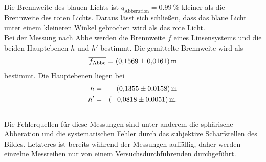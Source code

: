 Die Brennweite des blauen Lichts ist $q_{\text{Abberation}}= \SI{0.99}{\%}$ kleiner als die Brennweite des roten Lichts.
Daraus lässt sich schließen, dass das blaue Licht unter einem kleineren Winkel gebrochen wird als das rote Licht.
\\Bei der Messung nach Abbe werden die Brennweite $f$ eines Linsensystems und die beiden Hauptebenen $h$ und $h'$ bestimmt.
Die gemittelte Brennweite wird als
\begin{align*}
  \overline{f_{\text{Abbe}}}= \SI{0.1569 \pm 0.0161}{m}
\end{align*}
bestimmt.
Die Hauptebenen liegen bei
\begin{align*}
  h &=& \SI{0.1355 \pm 0.0158}{m}\\
  h' &=& \SI{-0.0818 \pm 0.0051}{m}.\\
\end{align*}
\\Die Fehlerquellen für diese Messungen sind unter anderem die sphärische Abberation und die systematischen Fehler durch das subjektive Scharfstellen des Bildes.
Letzteres ist bereits während der Messungen auffällig, daher werden einzelne Messreihen nur von einem Versuchsdurchführenden durchgeführt.
\FloatBarrier
